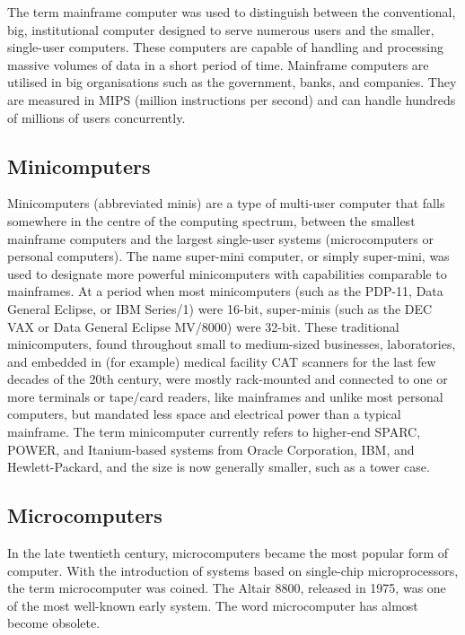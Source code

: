 \documentclass[10pt,british]{report}
\begin{document}
The term mainframe computer was used to distinguish between the conventional,
big, institutional computer designed to serve numerous users and the
smaller, single-user computers. These computers are capable of handling
and processing massive volumes of data in a short period of time.
Mainframe computers are utilised in big organisations such as the
government, banks, and companies. They are measured in MIPS (million
instructions per second) and can handle hundreds of millions of users
concurrently.

\subsection{Minicomputers}

Minicomputers (abbreviated \textquotedbl minis\textquotedbl ) are
a type of multi-user computer that falls somewhere in the centre of
the computing spectrum, between the smallest mainframe computers and
the largest single-user systems (microcomputers or personal computers).
The name super-mini computer, or simply super-mini, was used to designate
more powerful minicomputers with capabilities comparable to mainframes.
At a period when most minicomputers (such as the PDP-11, Data General
Eclipse, or IBM Series/1) were 16-bit, super-minis (such as the DEC
VAX or Data General Eclipse MV/8000) were 32-bit. These traditional
minicomputers, found throughout small to medium-sized businesses,
laboratories, and embedded in (for example) medical facility CAT scanners
for the last few decades of the 20th century, were mostly rack-mounted
and connected to one or more terminals or tape/card readers, like
mainframes and unlike most personal computers, but mandated less space
and electrical power than a typical mainframe. The term \textquotedbl minicomputer\textquotedbl{}
currently refers to higher-end SPARC, POWER, and Itanium-based systems
from Oracle Corporation, IBM, and Hewlett-Packard, and the size is
now generally smaller, such as a tower case.

\subsection{Microcomputers}

In the late twentieth century, microcomputers became the most popular
form of computer. With the introduction of systems based on single-chip
microprocessors, the term \textquotedbl microcomputer\textquotedbl{}
was coined. The Altair 8800, released in 1975, was one of the most
well-known early system. The word \textquotedbl microcomputer\textquotedbl{}
has almost become obsolete.
\end{document}
